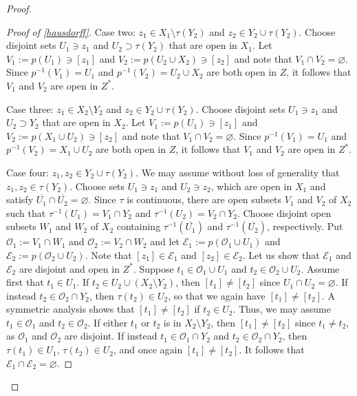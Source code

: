 \documentclass[12pt]{amsart}
\numberwithin{equation}{section}
\theoremstyle{definition}
\theoremstyle{remark}
\begin{document}
\begin{proof}
\begin{proof}[Proof of \autoref{hausdorff}]
		Case two: $z_{1}\in X_{1}\setminus \tau(Y_{2})$ and $z_{2}\in Y_{2}\cup \tau(Y_{2})$. Choose disjoint sets $U_{1}\ni z_{1}$ and $U_{2}\supset \tau(Y_{2})$ that are open in $X_{1}$. Let $V_{1}:=p(U_{1})\ni[z_{1}]$ and $V_{2}:=p(U_{2}\cup X_{2})\ni[z_{2}]$ and note that $V_{1}\cap V_{2}=\varnothing$. Since $p^{-1}(V_{1})=U_{1}$ and $p^{-1}(V_{2})=U_{2}\cup X_{2}$ are both open in $Z$, it follows that $V_{1}$ and $V_{2}$ are open in $Z^{*}$. 
		
		Case three: $z_{1}\in X_{2}\setminus Y_{2}$ and $z_{2}\in Y_{2}\cup \tau(Y_{2})$. Choose disjoint sets $U_{1}\ni z_{1}$ and $U_{2}\supset Y_{2}$ that are open in $X_{2}$. Let $V_{1}:=p(U_{1})\ni[z_{1}]$ and $V_{2}:=p(X_{1}\cup U_{2})\ni[z_{2}]$ and note that $V_{1}\cap V_{2}=\varnothing$. Since $p^{-1}(V_{1})=U_{1}$ and $p^{-1}(V_{2})=X_{1}\cup U_{2}$ are both open in $Z$, it follows that $V_{1}$ and $V_{2}$ are open in $Z^{*}$. 
		
		Case four: $z_{1},z_{2}\in Y_{2}\cup\tau(Y_{2})$. We may assume without loss of generality that $z_{1},z_{2}\in \tau(Y_{2})$. Choose sets $U_{1}\ni z_{1}$ and $U_{2}\ni z_{2}$, which are open in $X_{1}$ and satisfy $\overline{U_{1}}\cap\overline{U_{2}}=\varnothing$. Since $\tau$ is continuous, there are open subsets $V_{1}$ and $V_{2}$ of $X_{2}$ such that $\tau^{-1}(U_{1})=V_{1}\cap Y_{2}$ and $\tau^{-1}(U_{2})=V_{2}\cap Y_{2}$. Choose disjoint open subsets $W_{1}$ and $W_{2}$ of $X_{2}$ containing $\tau^{-1}(\overline{U_{1}})$ and $\tau^{-1}(\overline{U_{2}})$, respectively. Put $\mathcal{O}_{1}:=V_{1}\cap W_{1}$ and $\mathcal{O}_{2}:= V_{2}\cap W_{2}$ and let $\mathcal{E}_{1}:=p(\mathcal{O}_{1}\cup U_{1})$ and $\mathcal{E}_{2}:=p(\mathcal{O}_{2}\cup U_{2})$. Note that $[z_{1}]\in \mathcal{E}_{1}$ and $[z_{2}]\in\mathcal{E}_{2}$. Let us show that $\mathcal{E}_{1}$ and $\mathcal{E}_{2}$ are disjoint and open in $Z^{*}$. Suppose $t_{1}\in \mathcal{O}_{1}\cup U_{1}$ and $t_{2}\in \mathcal{O}_{2}\cup U_{2}$. Assume first that $t_{1}\in U_{1}$. If $t_{2}\in U_{2}\cup (X_{2}\setminus Y_{2})$, then $[t_{1}]\not=[t_{2}]$ since $U_{1}\cap U_{2}=\varnothing$. If instead $t_{2}\in \mathcal{O}_{2}\cap Y_{2}$, then $\tau(t_{2})\in U_{2}$, so that we again have $[t_{1}]\not=[t_{2}]$. A symmetric analysis shows that $[t_{1}]\not=[t_{2}]$ if $t_{2}\in U_{2}$. Thus, we may assume $t_{1}\in\mathcal{O}_{1}$ and $t_{2}\in\mathcal{O}_{2}$. If either $t_{1}$ or $t_{2}$ is in $X_{2}\setminus Y_{2}$, then $[t_{1}]\not=[t_{2}]$ since $t_{1}\not=t_{2}$, as $\mathcal{O}_{1}$ and $\mathcal{O}_{2}$ are disjoint. If instead $t_{1}\in\mathcal{O}_{1}\cap Y_{2}$ and $t_{2}\in\mathcal{O}_{2}\cap Y_{2}$, then $\tau(t_{1})\in U_{1}$, $\tau(t_{2})\in U_{2}$, and once again $[t_{1}]\not=[t_{2}]$. It follows that $\mathcal{E}_{1}\cap\mathcal{E}_{2}=\varnothing$. 
		

\end{proof}
\end{proof}
\end{document}
